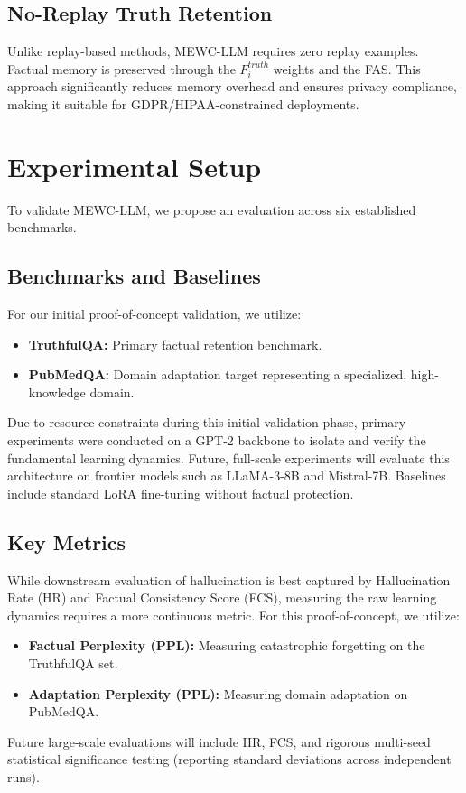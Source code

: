 \documentclass[10pt, conference, letterpaper]{IEEEtran}
\begin{document}
\subsection{No-Replay Truth Retention}
Unlike replay-based methods, MEWC-LLM requires zero replay examples. Factual memory is preserved through the $F_i^{truth}$ weights and the FAS. This approach significantly reduces memory overhead and ensures privacy compliance, making it suitable for GDPR/HIPAA-constrained deployments.

\section{Experimental Setup}
To validate MEWC-LLM, we propose an evaluation across six established benchmarks.

\subsection{Benchmarks and Baselines}
For our initial proof-of-concept validation, we utilize:
\begin{itemize}
    \item \textbf{TruthfulQA:} Primary factual retention benchmark.
    \item \textbf{PubMedQA:} Domain adaptation target representing a specialized, high-knowledge domain.
\end{itemize}

Due to resource constraints during this initial validation phase, primary experiments were conducted on a GPT-2 backbone to isolate and verify the fundamental learning dynamics. Future, full-scale experiments will evaluate this architecture on frontier models such as LLaMA-3-8B and Mistral-7B. Baselines include standard LoRA fine-tuning without factual protection.

\subsection{Key Metrics}
While downstream evaluation of hallucination is best captured by Hallucination Rate (HR) and Factual Consistency Score (FCS), measuring the raw learning dynamics requires a more continuous metric. For this proof-of-concept, we utilize:
\begin{itemize}
    \item \textbf{Factual Perplexity (PPL):} Measuring catastrophic forgetting on the TruthfulQA set.
    \item \textbf{Adaptation Perplexity (PPL):} Measuring domain adaptation on PubMedQA.
\end{itemize}
Future large-scale evaluations will include HR, FCS, and rigorous multi-seed statistical significance testing (reporting standard deviations across independent runs).
\end{document}
